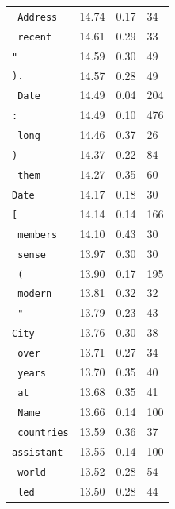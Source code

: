 \begin{table}[h!]
\begin{tabular}{llll}
\texttt{ Address} & 14.74 & 0.17 & 34 \\
\texttt{ recent} & 14.61 & 0.29 & 33 \\
\texttt{"} & 14.59 & 0.30 & 49 \\
\texttt{).} & 14.57 & 0.28 & 49 \\
\texttt{ Date} & 14.49 & 0.04 & 204 \\
\texttt{:} & 14.49 & 0.10 & 476 \\
\texttt{ long} & 14.46 & 0.37 & 26 \\
\texttt{)} & 14.37 & 0.22 & 84 \\
\texttt{ them} & 14.27 & 0.35 & 60 \\
\texttt{Date} & 14.17 & 0.18 & 30 \\
\texttt{[} & 14.14 & 0.14 & 166 \\
\texttt{ members} & 14.10 & 0.43 & 30 \\
\texttt{ sense} & 13.97 & 0.30 & 30 \\
\texttt{ (} & 13.90 & 0.17 & 195 \\
\texttt{ modern} & 13.81 & 0.32 & 32 \\
\texttt{ "} & 13.79 & 0.23 & 43 \\
\texttt{City} & 13.76 & 0.30 & 38 \\
\texttt{ over} & 13.71 & 0.27 & 34 \\
\texttt{ years} & 13.70 & 0.35 & 40 \\
\texttt{ at} & 13.68 & 0.35 & 41 \\
\texttt{ Name} & 13.66 & 0.14 & 100 \\
\texttt{ countries} & 13.59 & 0.36 & 37 \\
\texttt{assistant} & 13.55 & 0.14 & 100 \\
\texttt{ world} & 13.52 & 0.28 & 54 \\
\texttt{ led} & 13.50 & 0.28 & 44 \\
\bottomrule
\end{tabular}
\end{table}



